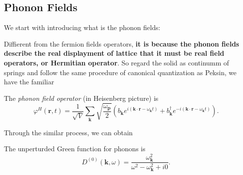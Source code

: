 \documentclass[b5paper,10pt,UTF8]{book}
\numberwithin{equation}{section}
\begin{document}
		\subsection{Phonon Fields}
			We start with introducing what is the phonon fields:\par
			Diffierent from the fermion fields operators, \textbf{it is because the phonon fields describe the real displayment of lattice that it must be real field operators, or Hermitian operator}. So regard the solid as continumm of springs and follow the same procedure of canonical quantization as Peksin, we have the familiar
			\begin{Def}
				The \emph{phonon field operator} (in Heisenberg picture) is
				\begin{equation}\label{2.3.11}
					\varphi^H(\bm{r},t)=\dfrac{1}{\sqrt{V}}\sum_{\bm{k}}\sqrt{\dfrac{\omega_{\bm p}}{2}}\left(b_{\bm k}e^{i(\bm{k\cdot r}-\omega_{\bm k}t)}+b_{\bm k}^\dagger e^{-i(\bm{k\cdot r}-\omega_{\bm k}t)}\right).
				\end{equation}
			\end{Def}
			Through the similar process, we can obtain
			\begin{Proposition}
				The unperturded Green function for phonons is
				\begin{equation}\label{2.3.12}
					D^{(0)}(\bm{k},\omega)=\dfrac{\omega_{\bm k}^2}{\omega^2-\omega_{\bm k}^2+i0}.
				\end{equation}
			\end{Proposition}
\end{document}
